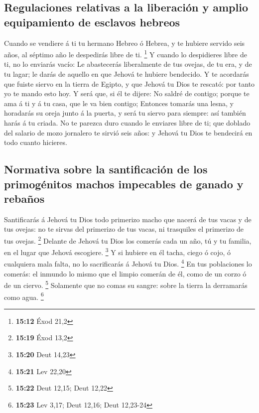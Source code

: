 \hypertarget{regulaciones-relativas-a-la-liberaciuxf3n-y-amplio-equipamiento-de-esclavos-hebreos}{%
\subsection{Regulaciones relativas a la liberación y amplio equipamiento
de esclavos
hebreos}\label{regulaciones-relativas-a-la-liberaciuxf3n-y-amplio-equipamiento-de-esclavos-hebreos}}

 Cuando se vendiere á ti tu hermano Hebreo ó Hebrea, y te
hubiere servido seis años, al séptimo año le despedirás libre de ti.
\footnote{\textbf{15:12} Éxod 21,2}  Y cuando lo
despidieres libre de ti, no lo enviarás vacío:  Le
abastecerás liberalmente de tus ovejas, de tu era, y de tu lagar; le
darás de aquello en que Jehová te hubiere bendecido.  Y te
acordarás que fuiste siervo en la tierra de Egipto, y que Jehová tu Dios
te rescató: por tanto yo te mando esto hoy.  Y será que, si
él te dijere: No saldré de contigo; porque te ama á ti y á tu casa, que
le va bien contigo;  Entonces tomarás una lesna, y
horadarás su oreja junto á la puerta, y será tu siervo para siempre: así
también harás á tu criada.  No te parezca duro cuando le
enviares libre de ti; que doblado del salario de mozo jornalero te
sirvió seis años: y Jehová tu Dios te bendecirá en todo cuanto hicieres.

\hypertarget{normativa-sobre-la-santificaciuxf3n-de-los-primoguxe9nitos-machos-impecables-de-ganado-y-rebauxf1os}{%
\subsection{Normativa sobre la santificación de los primogénitos machos
impecables de ganado y
rebaños}\label{normativa-sobre-la-santificaciuxf3n-de-los-primoguxe9nitos-machos-impecables-de-ganado-y-rebauxf1os}}

 Santificarás á Jehová tu Dios todo primerizo macho que
nacerá de tus vacas y de tus ovejas: no te sirvas del primerizo de tus
vacas, ni trasquiles el primerizo de tus ovejas. \footnote{\textbf{15:19}
  Éxod 13,2}  Delante de Jehová tu Dios los comerás cada un
año, tú y tu familia, en el lugar que Jehová escogiere. \footnote{\textbf{15:20}
  Deut 14,23}  Y si hubiere en él tacha, ciego ó cojo, ó
cualquiera mala falta, no lo sacrificarás á Jehová tu Dios. \footnote{\textbf{15:21}
  Lev 22,20}  En tus poblaciones lo comerás: el inmundo lo
mismo que el limpio comerán de él, como de un corzo ó de un ciervo.
\footnote{\textbf{15:22} Deut 12,15; Deut 12,22}  Solamente
que no comas su sangre: sobre la tierra la derramarás como agua.
\footnote{\textbf{15:23} Lev 3,17; Deut 12,16; Deut 12,23-24}

